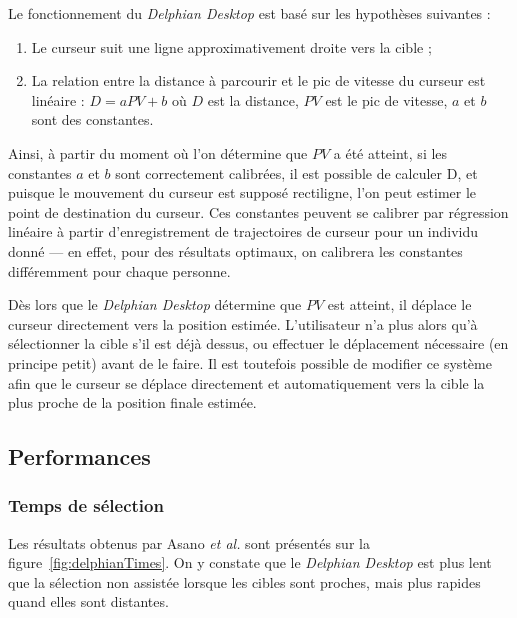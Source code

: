 	Le fonctionnement du \emph{Delphian Desktop} est basé sur les hypothèses suivantes :
	
	\begin{enumerate}
		\item Le curseur suit une ligne approximativement droite vers la cible ;
		\item La relation entre la distance à parcourir et le pic de vitesse du curseur est linéaire : $D = aPV + b$ où $D$ est la distance, $PV$ est le pic de vitesse, $a$ et $b$ sont des constantes.
	\end{enumerate}
	
	Ainsi, à partir du moment où l'on détermine que $PV$ a été atteint, si les constantes $a$ et $b$ sont correctement calibrées, il est possible de calculer D, et puisque le mouvement du curseur est supposé rectiligne, l'on peut estimer le point de destination du curseur. Ces constantes peuvent se calibrer par régression linéaire à partir d'enregistrement de trajectoires de curseur pour un individu donné --- en effet, pour des résultats optimaux, on calibrera les constantes différemment pour chaque personne.
	
	Dès lors que le \emph{Delphian Desktop} détermine que $PV$ est atteint, il déplace le curseur directement vers la position estimée. L'utilisateur n'a plus alors qu'à sélectionner la cible s'il est déjà dessus, ou effectuer le déplacement nécessaire (en principe petit) avant de le faire. Il est toutefois possible de modifier ce système afin que le curseur se déplace directement et automatiquement vers la cible la plus proche de la position finale estimée.
	
	\subsection{Performances}
	\subsubsection{Temps de sélection}
	Les résultats obtenus par Asano \emph{et al.}\cite{asano2005predictive} sont présentés sur la figure~\ref{fig:delphianTimes}. On y constate que le \emph{Delphian Desktop} est plus lent que la sélection non assistée lorsque les cibles sont proches, mais plus rapides quand elles sont distantes.
	

